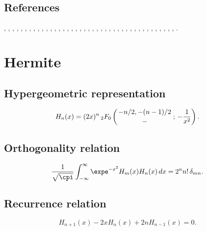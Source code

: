 \documentclass[envcountchap,graybox]{svmono}
\newcommand{\hyp}[5]{\mbox{}_{#1}{F}_{#2}
\left(\genfrac{}{}{0pt}{}{#3}{#4}\,;\,#5\right)}
\newcommand{\hyp}[5]{\,\mbox{}_{#1}F_{#2}\!\left(
  \genfrac{}{}{0pt}{}{#3}{#4};#5\right)}
\begin{document}
\subsection*{References}
\cite{Allaway76}, \cite{NAlSalam66}, \cite{AlSalam90}, \cite{AlSalamChihara76},
\cite{AlSalamIsmail76}, \cite{AndrewsAskey85}, \cite{Area+II}, \cite{Askey75},
\cite{AskeyGasper77}, \cite{AskeyWilson85}, \cite{AtakRahmanSuslov}, \cite{Bavinck98},
\cite{BavinckKoekoek}, \cite{Chihara78}, \cite{Chihara79}, \cite{Dunkl76}, \cite{Erdelyi+},
\cite{Gasper73I}, \cite{Gasper74}, \cite{Goh}, \cite{HoareRahman}, \cite{IsmailLetVal88},
\cite{Koekoek2000}, \cite{Koorn88}, \cite{Krasikov2002}, \cite{LabelleYehI},
\cite{LabelleYehII}, \cite{LabelleYehIII}, \cite{Lesky62}, \cite{Lesky89}, \cite{Lesky94I},
\cite{Lesky95II}, \cite{LewanowiczII}, \cite{LopezTemme2004}, \cite{Meixner}, \cite{Nikiforov+},
\cite{NikiforovUvarov}, \cite{Szafraniec}, \cite{Szego75}, \cite{Viennot}, \cite{Zarzo+},
\cite{Zeng90}.


\section{Hermite}

\par\setcounter{equation}{0}

\subsection*{Hypergeometric representation}
\begin{equation}
\label{DefHermite}
H_n(x)=(2x)^n\,\hyp{2}{0}{-n/2,-(n-1)/2}{-}{-\frac{1}{x^2}}.
\end{equation}

\subsection*{Orthogonality relation}
\begin{equation}
\label{OrtHermite}
\frac{1}{\sqrt{\cpi}}\int_{-\infty}^{\infty}\expe^{-x^2}H_m(x)H_n(x)\,dx
=2^nn!\,\delta_{mn}.
\end{equation}

\subsection*{Recurrence relation}
\begin{equation}
\label{RecHermite}
H_{n+1}(x)-2xH_n(x)+2nH_{n-1}(x)=0.
\end{equation}
\end{document}
